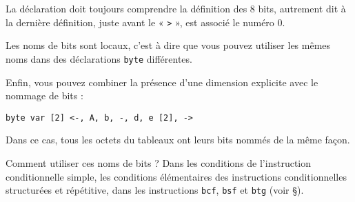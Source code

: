 La déclaration doit toujours comprendre la définition des 8 bits, autrement dit à la dernière définition, juste avant le « \texttt{>} », est associé le numéro 0.

Les noms de bits sont locaux, c’est à dire que vous pouvez utiliser les mêmes noms dans des déclarations \texttt{byte} différentes.

Enfin, vous pouvez combiner la présence d’une dimension explicite avec le nommage de bits :

\begin{lstlisting}[language=piccolo]
byte var [2] <-, A, b, -, d, e [2], ->
\end{lstlisting}

Dans ce cas, tous les octets du tableaux ont leurs bits nommés de la même façon.

Comment utiliser ces noms de bits ? Dans les conditions de l’instruction conditionnelle simple, les conditions élémentaires des instructions conditionnelles structurées et répétitive, dans les instructions \texttt{bcf}, \texttt{bsf} et \texttt{btg} (voir §). 


